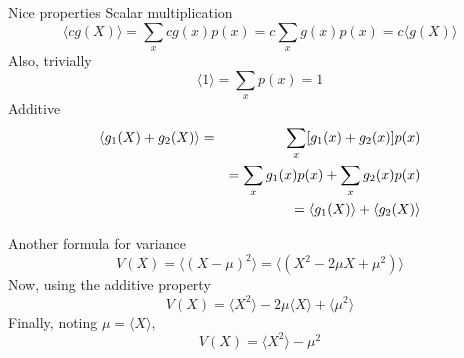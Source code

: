 \documentclass{beamer}
\newcommand{\crish}{\color{reddish}}
\newcommand{\cbla}{\color{black}}
\begin{document}
\begin{frame}{Nice properties}
  Scalar multiplication
\crish$$
    \langle c g(X)\rangle =\sum_x cg(x)p(x)=c\sum_x g(x)p(x)=c\langle g(X)\rangle
$$\cbla{}
Also, trivially
\crish$$
\langle 1\rangle=\sum_x p(x)=1
$$\cbla{}
Additive
\crish
\begin{eqnarray*}
\langle g_1(X)+g_2(X)\rangle &=&\sum_x [g_1(x)+g_2(x)]p(x)\cr
&&=\sum_x g_1(x)p(x)+\sum_x g_2(x)p(x)\cr
&&=\langle g_1(X)\rangle+\langle g_2(X)\rangle
\end{eqnarray*}
\cbla{} 
\end{frame}

\begin{frame}{Another formula for variance}
\crish$$
V(X)=\langle (X-\mu)^2\rangle=\langle (X^2-2\mu X+\mu^2)\rangle
$$\cbla{}
Now, using the additive property
\crish$$
V(X)=\langle X^2 \rangle -2\mu\langle X\rangle +\langle \mu^2 \rangle
$$\cbla{}
Finally, noting \crish$\mu=\langle X\rangle$\cbla{},
\crish$$
V(X)=\langle X^2 \rangle - \mu^2 
$$\cbla{}

\end{frame}
\end{document}
